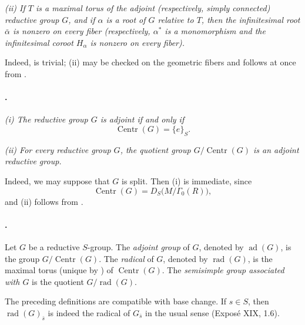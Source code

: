 \textit{\textup{(ii)} If \(T\) is a maximal torus of the adjoint
\textup{(respectively, simply connected)} reductive group \(G\),
and if \(\alpha\) is a root of \(G\) relative to \(T\), then the
infinitesimal root \(\bar\alpha\) is nonzero on every fiber
\textup{(respectively, \(\alpha^*\) is a monomorphism and the
infinitesimal coroot \(H_\alpha\) is nonzero on every fiber)}.}

Indeed, \textup{} is trivial; \textup{(ii)} may be checked on
the geometric fibers and follows at once from .

\paragraph{.}
\textit{\textup{(i)} The reductive group \(G\) is adjoint if and
only if}
\[
  \operatorname{Centr}(G)=\{e\}_S.
\]

\textit{\textup{(ii)} For every reductive group \(G\), the quotient
group \(G/\operatorname{Centr}(G)\) is an adjoint reductive group.}

Indeed, we may suppose that \(G\) is split. Then \textup{(i)} is
immediate, since
\[
  \operatorname{Centr}(G)=D_S\bigl(M/\Gamma_0(R)\bigr),
\]
and \textup{(ii)} follows from .

\paragraph{.}
Let \(G\) be a reductive \(S\)-group. The \emph{adjoint group} of
\(G\), denoted by \(\operatorname{ad}(G)\), is the group
\(G/\operatorname{Centr}(G)\). The \emph{radical} of \(G\), denoted
by \(\operatorname{rad}(G)\), is the maximal torus
\textup{(unique by )} of
\(\operatorname{Centr}(G)\). The \emph{semisimple group associated
with \(G\)} is the quotient \(G/\operatorname{rad}(G)\).

The preceding definitions are compatible with base change. If
\(s\in S\), then
\(\operatorname{rad}(G)_{\bar s}\) is indeed the radical of
\(G_{\bar s}\) in the usual sense \textup{(Exposé XIX, 1.6)}.

